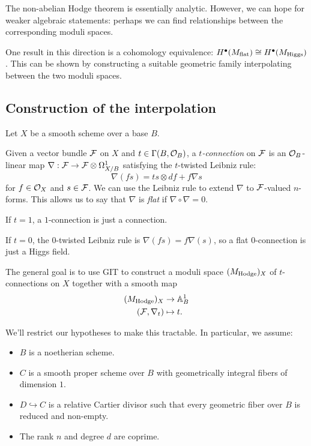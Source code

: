 \documentclass{amsart}
\begin{document}
The non-abelian Hodge theorem is essentially analytic.
However, we can hope for weaker algebraic statements: perhaps we can find relationships between the corresponding moduli spaces.

One result in this direction is a cohomology equivalence: $H^\bullet(M_{\mathrm{flat}}) \cong H^\bullet(M_{\mathrm{Higgs}})$.
This can be shown by constructing a suitable geometric family interpolating between the two moduli spaces.

\subsection{Construction of the interpolation}

Let $X$ be a smooth scheme over a base $B$.

\begin{dfn}
	Given a vector bundle $\mathcal{F}$ on $X$ and $t \in \Gamma(B, \mathcal{O}_B)$, a \emph{$t$-connection} on $\mathcal{F}$ is an $\mathcal{O}_B$-linear map $\nabla: \mathcal{F} \to \mathcal{F} \otimes \Omega_{X/B}^1$ satisfying the $t$-twisted Leibniz rule:
	\[
		\nabla (fs) = ts \otimes df + f \nabla s
	\]
	for $f \in \mathcal{O}_X$ and $s \in \mathcal{F}$.
	We can use the Leibniz rule to extend $\nabla$ to $\mathcal{F}$-valued $n$-forms.
	This allows us to say that $\nabla$ is \emph{flat} if $\nabla \circ \nabla = 0$.
\end{dfn}

\begin{ex}
	If $t = 1$, a $1$-connection is just a connection.
\end{ex}

\begin{ex}
	If $t = 0$, the $0$-twisted Leibniz rule is $\nabla(fs) = f \nabla(s)$, so a flat $0$-connection is just a Higgs field.
\end{ex}

The general goal is to use GIT to construct a moduli space $(M_{\mathrm{Hodge}})_X$ of $t$-connections on $X$ together with a smooth map 
\begin{align*}
	(M_{\mathrm{Hodge}})_X &\to \mathbb{A}^1_B \\
	(\mathcal{F}, \nabla_t) &\mapsto t.
\end{align*}

We'll restrict our hypotheses to make this tractable.
In particular, we assume:
\begin{itemize}
	\item $B$ is a noetherian scheme.
	\item $C$ is a smooth proper scheme over $B$ with geometrically integral fibers of dimension $1$.
	\item $D \hookrightarrow C$ is a relative Cartier divisor such that every geometric fiber over $B$ is reduced and non-empty.
	\item The rank $n$ and degree $d$ are coprime.
\end{itemize}
\end{document}
